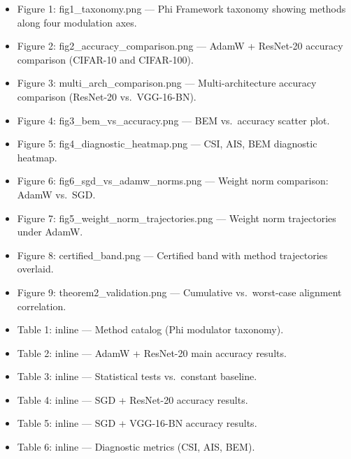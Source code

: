 \documentclass[
]{article}
\providecommand{\tightlist}{%
  \setlength{\itemsep}{0pt}\setlength{\parskip}{0pt}}
\begin{document}
\begin{itemize}
\tightlist
\item
  Figure 1: fig1\_taxonomy.png --- Phi Framework taxonomy showing
  methods along four modulation axes.
\item
  Figure 2: fig2\_accuracy\_comparison.png --- AdamW + ResNet-20
  accuracy comparison (CIFAR-10 and CIFAR-100).
\item
  Figure 3: multi\_arch\_comparison.png --- Multi-architecture accuracy
  comparison (ResNet-20 vs.~VGG-16-BN).
\item
  Figure 4: fig3\_bem\_vs\_accuracy.png --- BEM vs.~accuracy scatter
  plot.
\item
  Figure 5: fig4\_diagnostic\_heatmap.png --- CSI, AIS, BEM diagnostic
  heatmap.
\item
  Figure 6: fig6\_sgd\_vs\_adamw\_norms.png --- Weight norm comparison:
  AdamW vs.~SGD.
\item
  Figure 7: fig5\_weight\_norm\_trajectories.png --- Weight norm
  trajectories under AdamW.
\item
  Figure 8: certified\_band.png --- Certified band with method
  trajectories overlaid.
\item
  Figure 9: theorem2\_validation.png --- Cumulative vs.~worst-case
  alignment correlation.
\item
  Table 1: inline --- Method catalog (Phi modulator taxonomy).
\item
  Table 2: inline --- AdamW + ResNet-20 main accuracy results.
\item
  Table 3: inline --- Statistical tests vs.~constant baseline.
\item
  Table 4: inline --- SGD + ResNet-20 accuracy results.
\item
  Table 5: inline --- SGD + VGG-16-BN accuracy results.
\item
  Table 6: inline --- Diagnostic metrics (CSI, AIS, BEM).
\end{itemize}
\end{document}
